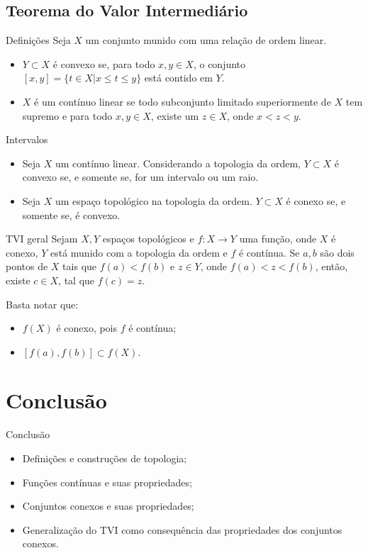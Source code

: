 \documentclass[aspectratio=169]{beamer}
\begin{document}
	\subsection{Teorema do Valor Intermediário}
	
	\begin{frame}{Definições}
		Seja $X$ um conjunto munido com uma relação de ordem linear.
		\begin{itemize}
			\item $Y \subset X$ é convexo se, para todo $x, y \in X$, o conjunto $[x, y] = \{t \in X| x \le t \le y\}$ está contido em $Y$.
			\item $X$ é um contínuo linear se todo subconjunto limitado superiormente de $X$ tem supremo e para todo $x, y \in X$, existe um $z\in X$, onde $x < z < y$.
		\end{itemize}
	\end{frame}
	
	\begin{frame}{Intervalos}
		\begin{itemize}
			\item Seja $X$ um contínuo linear. Considerando a topologia da ordem, $Y \subset X$ é convexo se, e somente se, for um intervalo ou um raio.
			\item Seja $X$ um espaço topológico na topologia da ordem. $Y \subset X$ é conexo se, e somente se, é convexo.
		\end{itemize}
	\end{frame}
	
	\begin{frame}{TVI geral}
		Sejam $X, Y$ espaços topológicos e $f:X \to Y$ uma função, onde $X$ é conexo, $Y$ está munido com a topologia da ordem e $f$ é contínua. Se $a, b$ são dois pontos de $X$ tais que $f(a) < f(b)$ e $z \in Y$, onde $f(a) < z < f(b)$, então, existe $c \in X$, tal que $f(c) = z$.    
		
		Basta notar que:
		\begin{itemize}
			\item $f(X)$ é conexo, pois $f$ é contínua;
			\item $[f(a), f(b)] \subset f(X)$.
		\end{itemize}
	\end{frame}
	
	\section{Conclusão}
	\begin{frame}{Conclusão}
		\begin{itemize}
			\item Definições e construções de topologia;
			\item Funções contínuas e suas propriedades;
			\item Conjuntos conexos e suas propriedades;
			\item Generalização do TVI como consequência das propriedades dos conjuntos conexos.
		\end{itemize}
	\end{frame}
	
\end{document}
